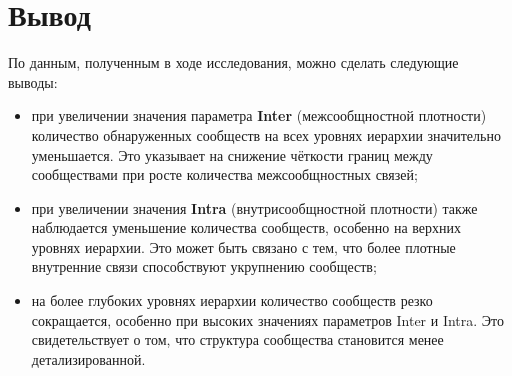 \section{Вывод}

По данным, полученным в ходе исследования, можно сделать следующие выводы:
\begin{itemize}
\item при увеличении значения параметра \textbf{Inter} (межсообщностной плотности) количество обнаруженных сообществ на всех уровнях иерархии значительно уменьшается. Это указывает на снижение чёткости границ между сообществами при росте количества межсообщностных связей;
\item при увеличении значения \textbf{Intra} (внутрисообщностной плотности) также наблюдается уменьшение количества сообществ, особенно на верхних уровнях иерархии. Это может быть связано с тем, что более плотные внутренние связи способствуют укрупнению сообществ;
\item на более глубоких уровнях иерархии количество сообществ резко сокращается, особенно при высоких значениях параметров Inter и Intra. Это свидетельствует о том, что структура сообщества становится менее детализированной.
\end{itemize}
